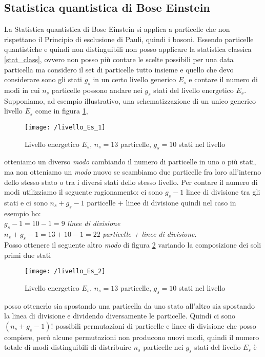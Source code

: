 \subsection{Statistica quantistica di Bose Einstein}
La Statistica quantistica di Bose Einstein si applica a particelle che non rispettano il Principio di esclusione di Pauli, quindi i bosoni.
Essendo particelle quantistiche e quindi non distinguibili non posso applicare la statistica classica \ref{stat_class}, ovvero non posso più contare le scelte possibili per una data particella ma considero il set di particelle tutto insieme e quello che devo considerare sono gli stati $g_s$ in un certo livello generico $E_s$ e contare il numero di modi in cui $n_s$ particelle possono andare nei $g_s$ stati del livello energetico $E_s$.
Supponiamo, ad esempio illustrativo, una schematizzazione di un unico generico livello $E_s$ come in figura \ref{livello_Es},
\begin{figure}[h]
\centering
\texttt{[image: /livello\_Es\_1]}
\caption{Livello energetico $E_s$, $n_s = 13$ particelle, $g_s = 10$ stati nel livello}
\label{livello_Es}
\end{figure}
otteniamo un diverso \textit{modo} cambiando il numero di particelle in uno o più stati, ma non otteniamo un \textit{modo} nuovo se scambiamo due particelle fra loro all'interno dello stesso stato o tra i diversi stati dello stesso livello.
Per contare il numero di modi utilizziamo il seguente ragionamento:
ci sono $g_s - 1$ linee di divisione tra gli stati
e ci sono $n_s + g_s - 1$ particelle + linee di divisione 
quindi nel caso in esempio ho: \\
$g_s - 1 = 10 - 1 = 9 $ \textit{linee di divisione} \\
$n_s + g_s - 1 = 13 + 10 - 1 = 22$ \textit{particelle + linee di divisione}. \\
Posso ottenere il seguente altro \textit{modo} di figura \ref{livello_Es_2} variando la composizione dei soli primi due stati 
\begin{figure}[h]
\centering
\texttt{[image: /livello\_Es\_2]}
\caption{Livello energetico $E_s$, $n_s = 13$ particelle, $g_s = 10$ stati nel livello}
\label{livello_Es_2}
\end{figure}
posso ottenerlo sia spostando una particella da uno stato all'altro sia spostando la linea di divisione e dividendo diversamente le particelle.
Quindi ci sono $(n_s + g_s - 1)!$ possibili permutazioni di particelle e linee di divisione che posso compiere, però alcune permutazioni non producono nuovi modi, quindi il numero totale di modi distinguibili di distribuire $n_s$ particelle nei $g_s$ stati del livello $E_s$ è
